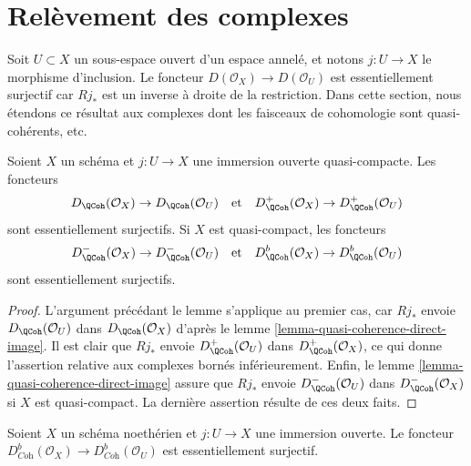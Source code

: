 \section{Relèvement des complexes}
\label{section-lift}

\noindent
Soit $U \subset X$ un sous-espace ouvert d'un espace annelé,
et notons $j : U \to X$ le morphisme d'inclusion. Le foncteur
$D(\mathcal{O}_X) \to D(\mathcal{O}_U)$ est essentiellement surjectif car
$Rj_*$ est un inverse à droite de la restriction.
Dans cette section, nous étendons ce résultat aux complexes dont les faisceaux
de cohomologie sont quasi-cohérents, etc.

\begin{lemma}
\label{lemma-lift-quasi-coherent}
Soient $X$ un schéma et $j : U \to X$ une immersion ouverte
quasi-compacte. Les foncteurs
$$
D_\QCoh(\mathcal{O}_X) \to D_\QCoh(\mathcal{O}_U)
\quad\text{et}\quad
D^+_\QCoh(\mathcal{O}_X) \to D^+_\QCoh(\mathcal{O}_U)
$$
sont essentiellement surjectifs. Si $X$ est quasi-compact, les foncteurs
$$
D^-_\QCoh(\mathcal{O}_X) \to D^-_\QCoh(\mathcal{O}_U)
\quad\text{et}\quad
D^b_\QCoh(\mathcal{O}_X) \to D^b_\QCoh(\mathcal{O}_U)
$$
sont essentiellement surjectifs.
\end{lemma}

\begin{proof}
L'argument précédant le lemme s'applique au premier cas, car $Rj_*$
envoie $D_\QCoh(\mathcal{O}_U)$ dans $D_\QCoh(\mathcal{O}_X)$
d'après le lemme \ref{lemma-quasi-coherence-direct-image}.
Il est clair que $Rj_*$ envoie
$D^+_\QCoh(\mathcal{O}_U)$ dans
$D^+_\QCoh(\mathcal{O}_X)$,
ce qui donne l'assertion relative aux complexes bornés inférieurement.
Enfin, le lemme \ref{lemma-quasi-coherence-direct-image}
assure que $Rj_*$ envoie
$D^-_\QCoh(\mathcal{O}_U)$ dans
$D^-_\QCoh(\mathcal{O}_X)$
si $X$ est quasi-compact. La dernière assertion résulte de ces deux faits.
\end{proof}

\begin{lemma}
\label{lemma-lift-coherent}
Soient $X$ un schéma noethérien et $j : U \to X$ une immersion ouverte.
Le foncteur
$D^b_{\textit{Coh}}(\mathcal{O}_X) \to D^b_{\textit{Coh}}(\mathcal{O}_U)$
est essentiellement surjectif.
\end{lemma}

